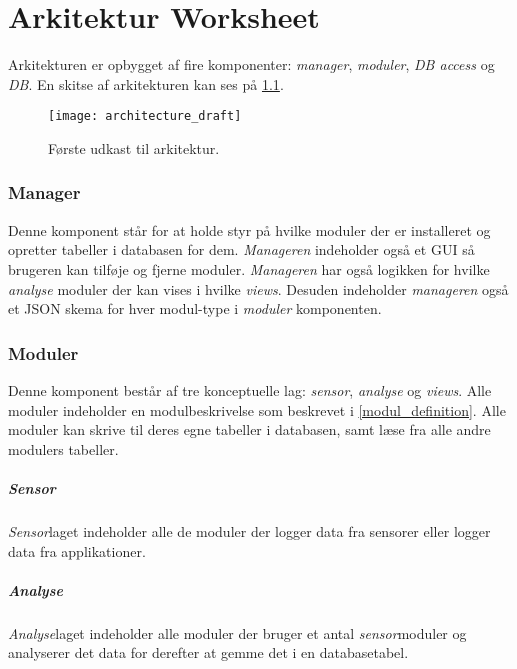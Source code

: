 \chapter{Arkitektur Worksheet}
Arkitekturen er opbygget af fire komponenter: \textit{manager}, \textit{moduler}, \textit{DB access} og \textit{DB}.
En skitse af arkitekturen kan ses på \cref{arkitektur_udkast_1}.
\begin{figure}[h]
	\texttt{[image: architecture\_draft]}
	\label{arkitektur_udkast_1}
	\caption{Første udkast til arkitektur.}
\end{figure}

\subsection*{Manager}
Denne komponent står for at holde styr på hvilke moduler der er installeret og opretter tabeller i databasen for dem.
\textit{Manageren} indeholder også et GUI så brugeren kan tilføje og fjerne moduler.
\textit{Manageren} har også logikken for hvilke \textit{analyse} moduler der kan vises i hvilke \textit{views}.
Desuden indeholder \textit{manageren} også et JSON skema for hver modul-type i \textit{moduler} komponenten.

\subsection*{Moduler}
Denne komponent består af tre konceptuelle lag: \textit{sensor}, \textit{analyse} og \textit{views}.
Alle moduler indeholder en modulbeskrivelse som beskrevet i \cref{modul_definition}. 
Alle moduler kan skrive til deres egne tabeller i databasen, samt læse fra alle andre modulers tabeller.

\paragraph{Sensor} \textit{Sensor}laget indeholder alle de moduler der logger data fra sensorer eller logger data fra applikationer.

\paragraph{Analyse}
\textit{Analyse}laget indeholder alle moduler der bruger et antal \textit{sensor}moduler og analyserer det data for derefter at gemme det i en databasetabel.

